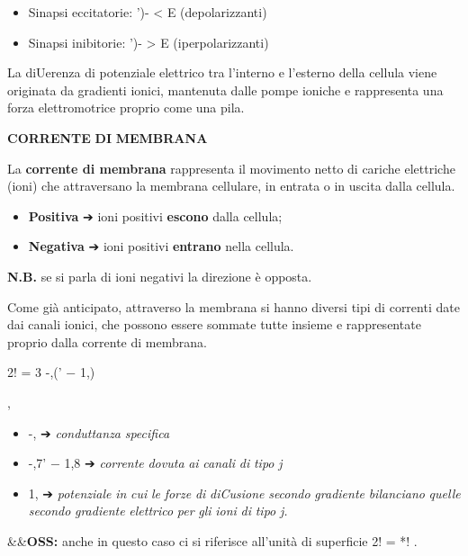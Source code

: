 \documentclass[12pt,a4paper]{book}
\begin{document}
\begin{itemize}
  \item Sinapsi eccitatorie: ')- < E (depolarizzanti)
  \item Sinapsi inibitorie: ')- > E (iperpolarizzanti)
\end{itemize}
La diUerenza di potenziale elettrico tra l'interno e l'esterno della cellula viene originata da gradienti ionici, mantenuta dalle pompe ioniche e rappresenta una forza elettromotrice proprio come una pila.

\textbf{CORRENTE}\textbf{ }\textbf{DI}\textbf{ }\textbf{MEMBRANA}

La \textbf{corrente di membrana }rappresenta il movimento netto di cariche elettriche (ioni) che attraversano la membrana cellulare, in entrata o in uscita dalla cellula.

\begin{itemize}
  \item \textbf{Positiva}\textbf{ }➔ ioni positivi \textbf{escono}\textbf{ }dalla cellula;
  \item \textbf{Negativa}\textbf{ }➔ ioni positivi \textbf{entrano}\textbf{ }nella cellula.
\end{itemize}
\textbf{N.B.}\textbf{ }se si parla di ioni negativi la direzione è opposta.

Come già anticipato, attraverso la membrana si hanno diversi tipi di correnti date dai canali ionici, che possono essere sommate tutte insieme e rappresentate proprio dalla corrente di membrana.

2! = 3 -,(' − 1,)

,

\begin{itemize}
  \item -, ➔ \textit{conduttanza}\textit{ }\textit{speciﬁca}
  \item -,7' − 1,8 ➔ \textit{corrente}\textit{ }\textit{dovuta}\textit{ }\textit{ai}\textit{ }\textit{canali}\textit{ }\textit{di}\textit{ }\textit{tipo}\textit{ }\textit{j}
  \item 1, ➔ \textit{potenziale}\textit{ }\textit{in}\textit{ }\textit{cui}\textit{ }\textit{le}\textit{ }\textit{forze}\textit{ }\textit{di}\textit{ }\textit{diCusione}\textit{ }\textit{secondo}\textit{ }\textit{gradiente}\textit{ }\textit{bilanciano}\textit{ }\textit{quelle }\textit{secondo}\textit{ }\textit{gradiente}\textit{ }\textit{elettrico}\textit{ }\textit{per}\textit{ }\textit{gli}\textit{ }\textit{ioni}\textit{ }\textit{di}\textit{ }\textit{tipo}\textit{ }\textit{j.}
\end{itemize}
\&\&\textbf{OSS:}\textbf{ }anche in questo caso ci si riferisce all'unità di superﬁcie 2! = *! .
\end{document}
